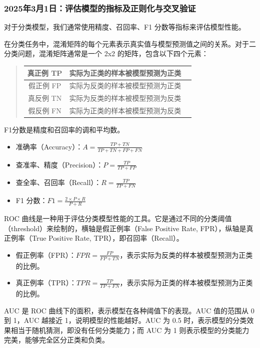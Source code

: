 \documentclass[12pt]{article}
\begin{document}
\subsubsection{2025年3月1日：评估模型的指标及正则化与交叉验证}
\noindent{}

对于分类模型，我们通常使用精度、召回率、F1 分数等指标来评估模型性能。

在分类任务中，混淆矩阵的每个元素表示真实值与模型预测值之间的关系。对于二分类问题，混淆矩阵通常是一个 2x2 的矩阵，包含以下四个元素：
\begin{quote}
    \begin{table}[h]
        \centering
        \begin{tabular}{|c|c|c|}  %

            \hline
            {真正例 TP} & 实际为正类的样本被模型预测为正类 \\
            \hline
            {假正例 FP} & 实际为反类的样本被模型预测为正类 \\
            \hline
            {真反例 TN} & 实际为反类的样本被模型预测为反类 \\
            \hline
            {假反例 FN} & 实际为正类的样本被模型预测为反类 \\
            \hline
        \end{tabular}
    \end{table}

\end{quote}
F1分数是精度和召回率的调和平均数。
\begin{itemize}
    \item 准确率（Accuracy）：$A = \frac{TP+TN}{TP+TN+FP+FN}$
    \item 查准率、精度（Precision）：$P = \frac{TP}{TP+FP}$
    \item 查全率、召回率（Recall）：$R = \frac{TP}{TP+FN}$
    \item F1 分数：$F1 = \frac{2 \times P \times R}{P + R}$
\end{itemize}
ROC 曲线是一种用于评估分类模型性能的工具。它是通过不同的分类阈值（threshold）来绘制的，横轴是假正例率（False Positive Rate, FPR），纵轴是真正例率（True Positive Rate, TPR），即召回率（Recall）。
\begin{itemize}
    \item 假正例率（FPR）：$FPR = \frac{FP}{FP+TN}$，表示实际为反类的样本被模型预测为正类的比例。
    \item 真正例率（TPR）：$TPR = \frac{TP}{TP+FN}$，表示实际为正类的样本被模型预测为正类的比例。
\end{itemize}
AUC 是 ROC 曲线下的面积，表示模型在各种阈值下的表现。AUC 值的范围从 0 到 1，AUC 越接近 1，说明模型的性能越好。AUC 为 0.5 时，表示模型的分类效果相当于随机猜测，即没有任何分类能力；而 AUC 为 1 则表示模型的分类能力完美，能够完全区分正类和负类。
\end{document}

